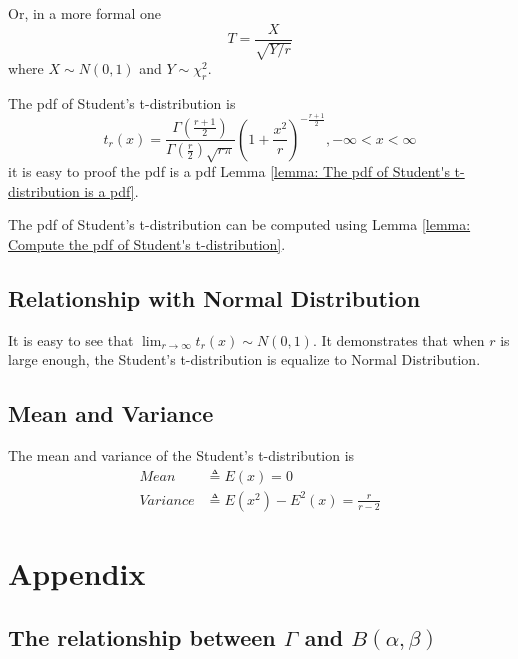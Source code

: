 \documentclass[a4paper]{article}
\begin{document}
Or, in a more formal one
\begin{equation}
    T = \frac{X}{\sqrt{Y/r}}
\end{equation}
where $X \sim N(0, 1)$ and $Y \sim \chi_r^2$.

The pdf of Student's t-distribution is
\begin{equation}
    t_r(x) = \frac{\Gamma(\frac{r+1}{2})}{\Gamma(\frac{r}{2}) \sqrt{r\pi}} (1+\frac{x^2}{r})^{-\frac{r+1}{2}}, -\infty < x < \infty
\end{equation}
it is easy to proof the pdf is a pdf Lemma \ref{lemma: The pdf of Student's t-distribution is a pdf}.

The pdf of Student's t-distribution can be computed using Lemma \ref{lemma: Compute the pdf of Student's t-distribution}.

\subsection{Relationship with Normal Distribution}

It is easy to see that $\lim_{r \to \infty} t_r(x) \sim N(0, 1)$.
It demonstrates that when $r$ is large enough, the Student's t-distribution is equalize to Normal Distribution.

\subsection{Mean and Variance}

The mean and variance of the Student's t-distribution is
\begin{equation*}
    \begin{align}
        Mean     & \triangleq E(x) = 0                        \\
        Variance & \triangleq E(x^2) - E^2(x) = \frac{r}{r-2}
    \end{align}
\end{equation*}

\newpage

\appendix

\section{Appendix}

\subsection{The relationship between $\Gamma$ and $B(\alpha, \beta)$}
\end{document}
